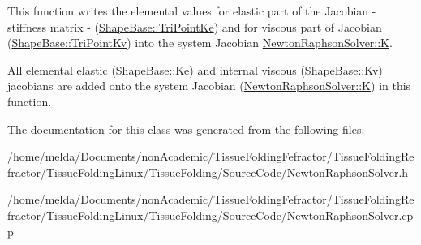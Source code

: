 This function writes the elemental values for elastic part of the Jacobian -\/ stiffness matrix -\/ (\hyperlink{classShapeBase_ace20710f27099833509c474b221c25df}{Shape\+Base\+::\+Tri\+Point\+Ke}) and for viscous part of Jacobian (\hyperlink{classShapeBase_a7fa5b1338e405a2c75c8d010f4153b05}{Shape\+Base\+::\+Tri\+Point\+Kv}) into the system Jacobian \hyperlink{classNewtonRaphsonSolver_a4e9ffc424dd37c6c00f9de3d7ac455ed}{Newton\+Raphson\+Solver\+::\+K}. 

All elemental elastic (Shape\+Base\+::\+Ke) and internal viscous (Shape\+Base\+::\+Kv) jacobians are added onto the system Jacobian (\hyperlink{classNewtonRaphsonSolver_a4e9ffc424dd37c6c00f9de3d7ac455ed}{Newton\+Raphson\+Solver\+::\+K}) in this function.

The documentation for this class was generated from the following files\+:\begin{DoxyCompactItemize}
\item 
/home/melda/\+Documents/non\+Academic/\+Tissue\+Folding\+Fefractor/\+Tissue\+Folding\+Refractor/\+Tissue\+Folding\+Linux/\+Tissue\+Folding/\+Source\+Code/Newton\+Raphson\+Solver.\+h\item 
/home/melda/\+Documents/non\+Academic/\+Tissue\+Folding\+Fefractor/\+Tissue\+Folding\+Refractor/\+Tissue\+Folding\+Linux/\+Tissue\+Folding/\+Source\+Code/Newton\+Raphson\+Solver.\+cpp\end{DoxyCompactItemize}
